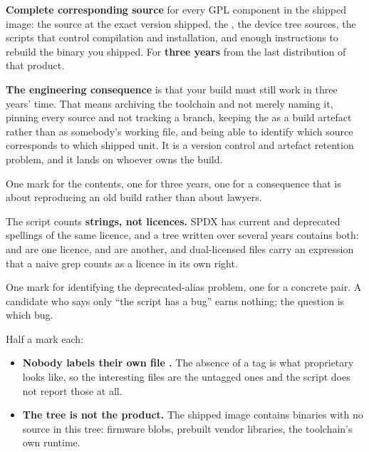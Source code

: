 \textbf{Complete corresponding source} for every GPL component in the shipped image: the source at
the exact version shipped, the , the device tree sources, the scripts that control
compilation and installation, and enough instructions to rebuild the binary you shipped. For
\textbf{three years} from the last distribution of that product.

\textbf{The engineering consequence} is that your build must still work in three years' time. That
means archiving the toolchain and not merely naming it, pinning every source and not tracking a
branch, keeping the  as a build artefact rather than as somebody's working file, and
being able to identify which source corresponds to which shipped unit. It is a version control and
artefact retention problem, and it lands on whoever owns the build.

One mark for the contents, one for three years, one for a consequence that is about reproducing an
old build rather than about lawyers.

The script counts \textbf{strings, not licences.} SPDX has current and deprecated spellings of the
same licence, and a tree written over several years contains both:  and
 are one licence,  and  are another, and
dual-licensed files carry an  expression that a naive grep counts as a licence in its own
right.

One mark for identifying the deprecated-alias problem, one for a concrete pair. A candidate who says
only ``the script has a bug'' earns nothing; the question is which bug.

Half a mark each:
\begin{itemize}
  \item \textbf{Nobody labels their own file .} The absence of a tag is what
    proprietary looks like, so the interesting files are the untagged ones and the script does not
    report those at all.
  \item \textbf{The tree is not the product.} The shipped image contains binaries with no source in
    this tree: firmware blobs, prebuilt vendor libraries, the toolchain's own runtime.
\end{itemize}


